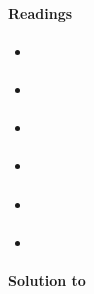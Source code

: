 \paragraph{Readings}
\begin{itemize}
	\item \textcite{Christiano.Trabandt.Walentin_2010_DSGEModelsMonetary}
	\item \textcite[Ch.3]{Gali_2015_MonetaryPolicyInflation}
	\item \textcite[Ch.19]{Heijdra_2017_FoundationsModernMacroeconomics}
	\item \textcite[Ch.7]{Romer_2019_AdvancedMacroeconomics}
	\item \textcite[Ch.8]{Walsh_2017_MonetaryTheoryPolicy}
	\item \textcite[Ch.3]{Woodford_2003_InterestPricesFoundations}
\end{itemize}

\begin{solution}\textbf{Solution to }
\ifDisplaySolutions%

\fi
\newpage
\end{solution}